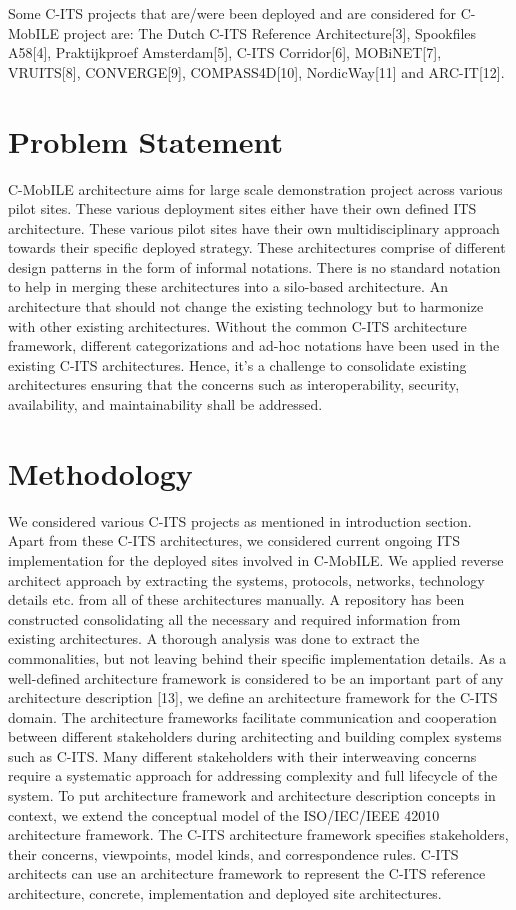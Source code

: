 \documentclass[conference]{IEEEtran}
\begin{document}
Some C-ITS projects that are/were been deployed and are considered for C-MobILE project are: The Dutch C-ITS Reference Architecture[3], Spookfiles A58[4], Praktijkproef Amsterdam[5], C-ITS Corridor[6], MOBiNET[7], VRUITS[8], CONVERGE[9], COMPASS4D[10], NordicWay[11] and ARC-IT[12].

\section{Problem Statement}

C-MobILE architecture aims for large scale demonstration project across various pilot sites. These various deployment sites either have their own defined ITS architecture. These various pilot sites have their own multidisciplinary approach towards their specific deployed strategy. These architectures comprise of different design patterns in the form of informal notations. There is no standard notation to help in merging these architectures into a silo-based architecture. An architecture that should not change the existing technology but to harmonize with other existing architectures. Without the common C-ITS architecture framework, different categorizations and ad-hoc notations have been used in the existing C-ITS architectures. Hence, it's a challenge to consolidate existing architectures ensuring that the concerns such as interoperability, security, availability, and maintainability shall be addressed. 

\section{Methodology}

We considered various C-ITS projects as mentioned in introduction section. Apart from these C-ITS architectures, we considered current ongoing ITS implementation for the deployed sites involved in C-MobILE. We applied reverse architect approach by extracting the systems, protocols, networks, technology details etc. from all of these architectures manually.  A repository has been constructed consolidating all the necessary and required information from existing architectures. A thorough analysis was done to extract the commonalities, but not leaving behind their specific implementation details. As a well-defined architecture framework is considered to be an important part of any architecture description [13], we define an architecture framework for the C-ITS domain. The architecture frameworks facilitate communication and cooperation between different stakeholders during architecting and building complex systems such as C-ITS. Many different stakeholders with their interweaving concerns require a systematic approach for addressing complexity and full lifecycle of the system. To put architecture framework and architecture description concepts in context, we extend the conceptual model of the ISO/IEC/IEEE 42010 architecture framework. The C-ITS architecture framework specifies stakeholders, their concerns, viewpoints, model kinds, and correspondence rules. C-ITS architects can use an architecture framework to represent the C-ITS reference architecture, concrete, implementation and deployed site architectures. 
\end{document}
